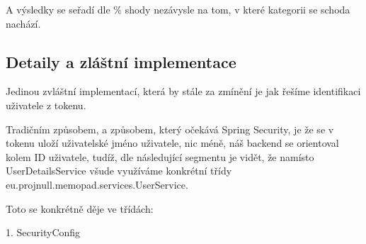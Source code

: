 A výsledky se seřadí dle \% shody nezávysle na tom, v které kategorii se schoda nachází.

\subsection{Detaily a zláštní implementace}

Jedinou zvláštní implementací, která by stále za zmínění je jak řešíme
identifikaci uživatele z tokenu.

Tradičním způsobem, a způsobem, který očekává Spring Security, je že se v
tokenu uloží uživatelské jméno uživatele, nic méně, náš backend se orientoval
kolem ID uživatele, tudíž, dle následující segmentu je vidět, že namísto
UserDetailsService všude využíváme konkrétní třídy
eu.projnull.memopad.services.UserService.

Toto se konkrétně děje ve třídách:

1. SecurityConfig

